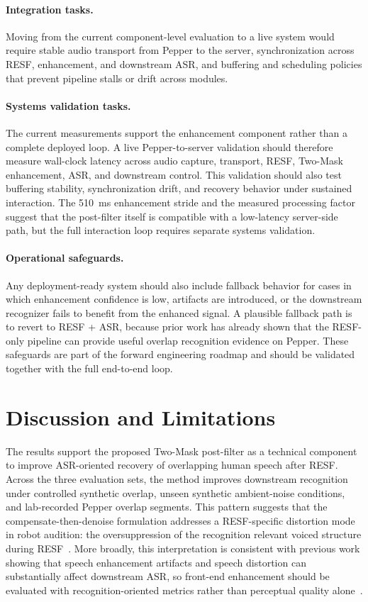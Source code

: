 \documentclass[manuscript,screen,review]{acmart}
\begin{document}
\paragraph{Integration tasks.}
Moving from the current component-level evaluation to a live system would require stable audio transport from Pepper to the server, synchronization across RESF, enhancement, and downstream ASR, and buffering and scheduling policies that prevent pipeline stalls or drift across modules.

\paragraph{Systems validation tasks.}
The current measurements support the enhancement component rather than a complete deployed loop. A live Pepper-to-server validation should therefore measure wall-clock latency across audio capture, transport, RESF, Two-Mask enhancement, ASR, and downstream control. This validation should also test buffering stability, synchronization drift, and recovery behavior under sustained interaction. The 510~ms enhancement stride and the measured processing factor suggest that the post-filter itself is compatible with a low-latency server-side path, but the full interaction loop requires separate systems validation.

\paragraph{Operational safeguards.}
Any deployment-ready system should also include fallback behavior for cases in which enhancement confidence is low, artifacts are introduced, or the downstream recognizer fails to benefit from the enhanced signal. A plausible fallback path is to revert to RESF + ASR, because prior work has already shown that the RESF-only pipeline can provide useful overlap recognition evidence on Pepper. These safeguards are part of the forward engineering roadmap and should be validated together with the full end-to-end loop.

\section{Discussion and Limitations}
\label{sec:discussion_limitations}

The results support the proposed Two-Mask post-filter as a technical component to improve ASR-oriented recovery of overlapping human speech after RESF. Across the three evaluation sets, the method improves downstream recognition under controlled synthetic overlap, unseen synthetic ambient-noise conditions, and lab-recorded Pepper overlap segments. This pattern suggests that the compensate-then-denoise formulation addresses a RESF-specific distortion mode in robot audition: the oversuppression of the recognition relevant voiced structure during RESF~\cite{Li_2024,li2024near}. More broadly, this interpretation is consistent with previous work showing that speech enhancement artifacts and speech distortion can substantially affect downstream ASR, so front-end enhancement should be evaluated with recognition-oriented metrics rather than perceptual quality alone~\cite{braun2022effect,iwamoto2022bad}.
\end{document}

